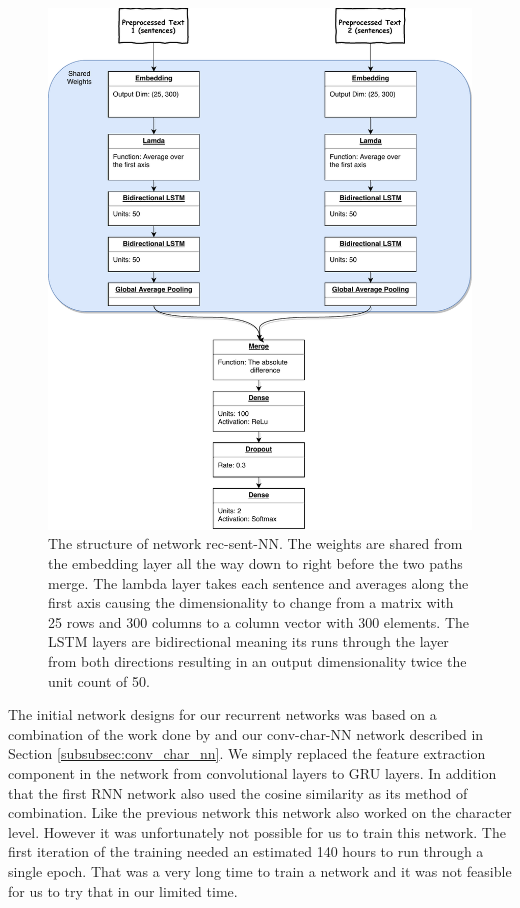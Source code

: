 \begin{figure}
    \centering
    \includegraphics[width=\textwidth]{./pictures/experiments/rec_sent_nn/model}
    \caption{The structure of network \gls{rec-sent-NN}. The weights are shared
        from the embedding layer all the way down to right before the two
        paths merge. The lambda layer takes each sentence and averages along
        the first axis causing the dimensionality to change from a matrix with
        25 rows and 300 columns to a column vector with 300 elements. The LSTM
        layers are bidirectional meaning its runs through the layer from both
        directions resulting in an output dimensionality twice the unit count
        of 50.
    \label{fig:rec-sent-NN}}
\end{figure}

The initial network designs for our recurrent networks was based on a
combination of the work done by \citet{qian:2018} and our \gls{conv-char-NN}
network described in Section \ref{subsubsec:conv_char_nn}. We simply replaced
the feature extraction component in the network from convolutional layers to
\gls{GRU} layers. In addition that the first \gls{RNN} network also used the
cosine similarity as its method of combination. Like the previous network this
network also worked on the character level. However it was unfortunately not
possible for us to train this network. The first iteration of the training
needed an estimated 140 hours to run through a single epoch. That was a very
long time to train a network and it was not feasible for us to try that in our
limited time.

